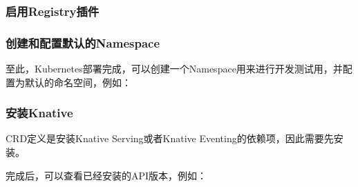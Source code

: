 \documentclass[12pt]{article}
\begin{document}
\subsubsection{启用Registry插件}\label{ux542fux7528registryux63d2ux4ef6}

\begin{Shaded}
\begin{Highlighting}[]
 
\end{Highlighting}
\end{Shaded}

\subsubsection{创建和配置默认的Namespace}\label{ux521bux5efaux548cux914dux7f6eux9ed8ux8ba4ux7684namespace}

至此，Kubernetes部署完成，可以创建一个Namespace用来进行开发测试用，并配置为默认的命名空间，例如：

\begin{Shaded}
\begin{Highlighting}[]
 \OperatorTok{=}
\end{Highlighting}
\end{Shaded}

\subsubsection{安装Knative}\label{ux5b89ux88c5knative-1}

CRD定义是安装Knative Serving或者Knative Eventing的依赖项，因此需要先安装。

\begin{Shaded}
\begin{Highlighting}[]
\DataTypeTok{\textbackslash{}}
  \DataTypeTok{\textbackslash{}}
\end{Highlighting}
\end{Shaded}

完成后，可以查看已经安装的API版本，例如：
\end{document}
